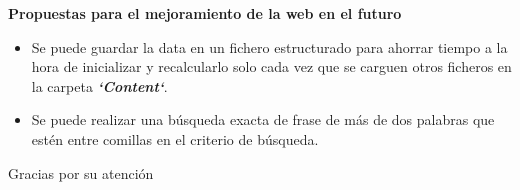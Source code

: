 \documentclass{beamer}
\begin{document}
\begin{frame}
 \begin{flushleft}
\Large {\textbf{ Propuestas para el mejoramiento de la web en el futuro}}\linebreak \\
\begin{itemize}
\item\large{ Se puede guardar la data en un fichero estructurado para ahorrar tiempo a la hora de 
inicializar y recalcularlo solo cada vez que se carguen otros ficheros en la carpeta 
\textbf{\textit{`Content`}}.}
\item\large{ Se puede realizar una búsqueda exacta de frase de más de dos palabras que estén 
entre comillas en el criterio de búsqueda.}
\end{itemize}
\end{flushleft}
\end{frame}

\begin{frame}
 \begin{center}
\LARGE{Gracias por su atención}
\end{center}
\end{frame}
\end{document}
